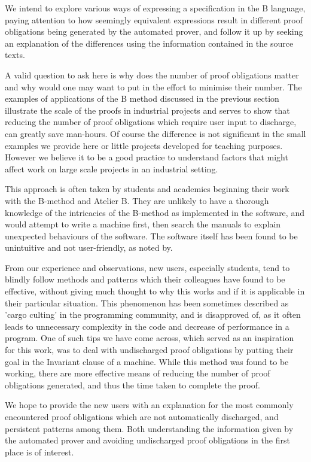 \documentclass[12pt,journal,duplex]{IEEEtran}
\begin{document}
	We intend to explore various ways of expressing a specification in the B language, paying attention to how seemingly equivalent expressions result in different proof obligations being generated by the automated prover, and follow it up by seeking an explanation of the differences using the information contained in the source texts.

	A valid question to ask here is why does the number of proof obligations matter and why would one may want to put in the effort to minimise their number. The examples of applications of the B method discussed in the previous section illustrate the scale of the proofs in industrial projects and serves to show that reducing the number of proof obligations which require user input to discharge, can greatly save man-hours. Of course the difference is not significant in the small examples we provide here or little projects developed for teaching purposes. However we believe it to be a good practice to understand factors that might affect work on large scale projects in an industrial setting.

	This approach is often taken by students and academics beginning their work with the B-method and Atelier B. They are unlikely to have a thorough knowledge of the intricacies of the B-method as implemented in the software, and would attempt to write a machine first, then search the manuals to explain unexpected behaviours of the software. The software itself has been found to be unintuitive and not user-friendly, as noted by\cite{San Juan metro}.

	From our experience and observations, new users, especially students, tend to blindly follow methods and patterns which their colleagues have found to be effective, without giving much thought to why this works and if it is applicable in their particular situation. This phenomenon has been sometimes described as 'cargo culting' in the programming community\cite{Cargo culting}, and is disapproved of, as it often leads to unnecessary complexity in the code and decrease of performance in a program. One of such tips we have come across, which served as an inspiration for this work, was to deal with undischarged proof obligations by putting their goal in the Invariant clause of a machine. While this method was found to be working, there are more effective means of reducing the number of proof obligations generated, and thus the time taken to complete the proof.

	We hope to provide the new users with an explanation for the most commonly encountered proof obligations which are not automatically discharged, and persistent patterns among them. Both understanding the information given by the automated prover and avoiding undischarged proof obligations in the first place is of interest.
\end{document}
